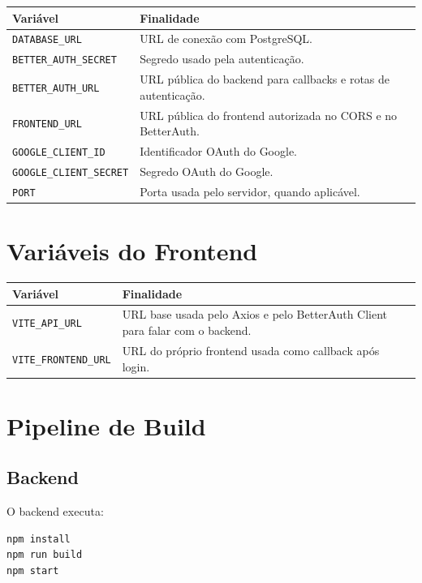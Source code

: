 \documentclass[
    12pt,
    oneside,
    openright,
    a4paper,
    english,
    brazil
]{abntex2}
\begin{document}
\begin{longtable}{|p{5cm}|p{9cm}|}
\hline
\textbf{Variável} & \textbf{Finalidade} \\
\hline
\texttt{DATABASE\_URL} & URL de conexão com PostgreSQL. \\
\hline
\texttt{BETTER\_AUTH\_SECRET} & Segredo usado pela autenticação. \\
\hline
\texttt{BETTER\_AUTH\_URL} & URL pública do backend para callbacks e rotas de autenticação. \\
\hline
\texttt{FRONTEND\_URL} & URL pública do frontend autorizada no CORS e no BetterAuth. \\
\hline
\texttt{GOOGLE\_CLIENT\_ID} & Identificador OAuth do Google. \\
\hline
\texttt{GOOGLE\_CLIENT\_SECRET} & Segredo OAuth do Google. \\
\hline
\texttt{PORT} & Porta usada pelo servidor, quando aplicável. \\
\hline
\end{longtable}

\section{Variáveis do Frontend}

\begin{longtable}{|p{5cm}|p{9cm}|}
\hline
\textbf{Variável} & \textbf{Finalidade} \\
\hline
\texttt{VITE\_API\_URL} & URL base usada pelo Axios e pelo BetterAuth Client para falar com o backend. \\
\hline
\texttt{VITE\_FRONTEND\_URL} & URL do próprio frontend usada como callback após login. \\
\hline
\end{longtable}

\section{Pipeline de Build}

\subsection{Backend}

O backend executa:

\begin{lstlisting}[language=bash]
npm install
npm run build
npm start
\end{lstlisting}
\end{document}
